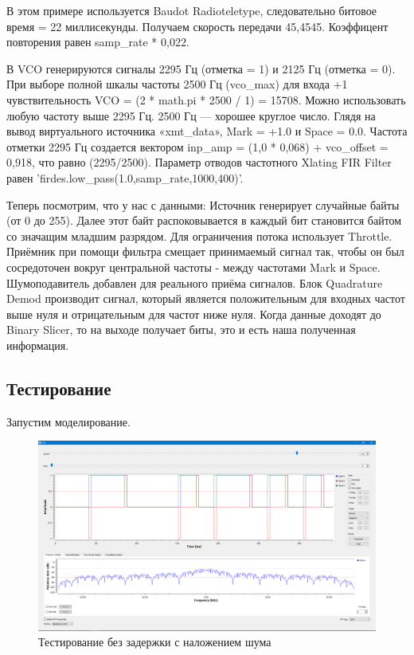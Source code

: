 В этом примере используется Baudot Radioteletype, следовательно битовое время = 22 миллисекунды. Получаем скорость передачи 45,4545.
Коэффицент повторения равен samp\_rate * 0,022.

В VCO генерируются сигналы 2295 Гц (отметка = 1) и 2125 Гц (отметка = 0). При выборе полной шкалы частоты 2500 Гц (vco\_max) для входа +1 чувствительность VCO = (2 * math.pi * 2500 / 1) = 15708. Можно использовать любую частоту выше 2295 Гц. 2500 Гц — хорошее круглое число. Глядя на вывод виртуального источника «xmt\_data», Mark = +1.0 и Space = 0.0. Частота отметки 2295 Гц создается вектором inp\_amp = (1,0 * 0,068) + vco\_offset = 0,918, что равно (2295/2500). Параметр отводов частотного Xlating FIR Filter равен 'firdes.low\_pass(1.0,samp\_rate,1000,400)'.

Теперь посмотрим, что у нас с данными:
\quad Источник генерирует случайные байты (от 0 до 255). Далее этот байт распоковывается в каждый бит становится байтом со значащим младшим разрядом. Для ограничения потока использует Throttle.
\quad Приёмник при помощи фильтра смещает принимаемый сигнал так, чтобы он был сосредоточен вокруг центральной частоты - между частотами Mark и Space. Шумоподавитель добавлен для реального приёма сигналов. Блок Quadrature Demod производит сигнал, который является положительным для входных частот выше нуля и отрицательным для частот ниже нуля. Когда данные доходят до Binary Slicer, то на выходе получает биты, это и есть наша полученная информация.


\subsection{Тестирование}
Запустим моделирование.

    \begin{figure}[H]
	\begin{center}
		\includegraphics[scale=0.27]{fig/lab12/lab12_03.png}
		\caption{Тестирование без задержки с наложением шума}
		\label{pic:e1} %
	\end{center}
\end{figure}

